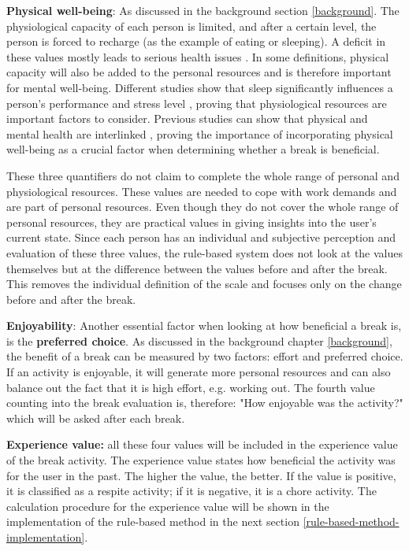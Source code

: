 \documentclass{hasel_thesis}
\begin{document}
\textbf{Physical well-being}: As discussed in the background section \ref{background}. The physiological capacity of each person is limited, and after a certain level, the person is forced to recharge (as the example of eating or sleeping). A deficit in these values mostly leads to serious health issues \cite{Trougakos.2009}. In some definitions, physical capacity will also be added to the personal resources and is therefore important for mental well-being. Different studies show that sleep significantly influences a person's performance and stress level \cite{Rosekind.2010, Choi.2018}, proving that physiological resources are important factors to consider. Previous studies can show that physical and mental health are interlinked \cite{Doan.2022}, proving the importance of incorporating physical well-being as a crucial factor when determining whether a break is beneficial. 

These three quantifiers do not claim to complete the whole range of personal and physiological resources. These values are needed to cope with work demands and are part of personal resources. Even though they do not cover the whole range of personal resources, they are practical values in giving insights into the user's current state. Since each person has an individual and subjective perception and evaluation of these three values, the rule-based system does not look at the values themselves but at the difference between the values before and after the break. This removes the individual definition of the scale and focuses only on the change before and after the break. 

\textbf{Enjoyability}: Another essential factor when looking at how beneficial a break is, is the \textbf{preferred choice}. As discussed in the background chapter \ref{background}, the benefit of a break can be measured by two factors: effort and preferred choice. If an activity is enjoyable, it will generate more personal resources and can also balance out the fact that it is high effort, e.g. working out. The fourth value counting into the break evaluation is, therefore: "How enjoyable was the activity?" which will be asked after each break.

\textbf{Experience value:} all these four values will be included in the experience value of the break activity. The experience value states how beneficial the activity was for the user in the past. The higher the value, the better. If the value is positive, it is classified as a respite activity; if it is negative, it is a chore activity. The calculation procedure for the experience value will be shown in the implementation of the rule-based method in the next section \ref{rule-based-method-implementation}.
\end{document}
